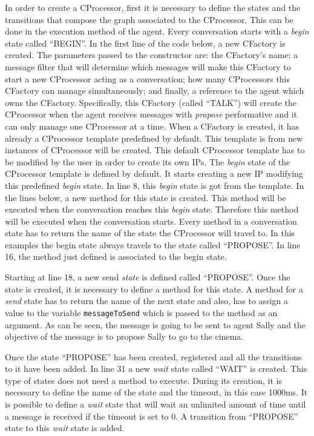 In order to create a CProcessor, first it is necessary to define the states and the transitions that compose the graph associated to the CProcessor. This can be done in the execution method of the agent. Every conversation starts with a \textit{begin} state called ``BEGIN''. In the first line of the code below, a new CFactory is created. The parameters passed to the constructor are: the CFactory's name; a message filter that will determine which messages will make this CFactory to start a new CProcessor acting as a conversation; how many CProcessors this CFactory can manage simultaneously; and finally, a reference to the agent which owns the CFactory. Specifically, this CFactory  (called ``TALK'') will create the CProcessor when the agent receives messages with \textit{propose} performative and it can only manage one CProcessor at a time. When a CFactory is created, it has already a CProcessor template predefined by default. This template is from new instances of CProcessor will be created. This default CProcessor template has to be modified by the user in order to create its own IPs. The \emph{begin} state of the CProcessor template is defined by default. It starts creating a new IP modifying this predefined \emph{begin} state. In line 8, this \textit{begin} state is got from the template. In the lines below, a new method for this state is created. This method will be executed when the conversation reaches this \textit{begin} state. Therefore this method will be executed when the conversation starts. Every method in a conversation state has to return the name of the state the CProcessor will travel to. In this examples the begin state always travels to the state called ``PROPOSE''. In line 16, the method just defined is associated to the begin state.

Starting at line 18, a new send \textit{state} is defined called ``PROPOSE''. Once the state is created, it is necessary to define a method for this state. A method for a \textit{send} state has to return the name of the next state and also, has to assign a value to the variable \texttt{messageToSend} which is passed to the method as an argument. As can be seen, the message is going to be sent to agent Sally and the objective of the message is to propose Sally to go to the cinema.

Once the state ``PROPOSE'' has been created, registered and all the transitions to it have been added. In line 31 a new \emph{wait} state called ``WAIT'' is created.  This type of states does not need a method to execute. During its creation, it is necessary to define the name of the state and the timeout, in this case 1000ms. It is possible to define a \textit{wait} state that will wait an unlimited amount of time until a message is received if the timeout is set to 0. A transition from ``PROPOSE'' state to this \emph{wait} state is added.

